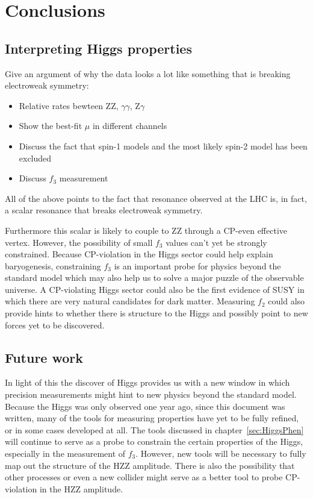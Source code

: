 



\chapter{Conclusions}
\label{sec:Conclusions}

\section{Interpreting Higgs properties}

Give an argument of why the data looks a lot like 
something that is breaking electroweak symmetry:

\begin{itemize}
  \item Relative rates bewteen ZZ, $\gamma\gamma$, Z$\gamma$
  \item Show the best-fit $\mu$ in different channels
  \item Discuss the fact that spin-1 models and the most 
    likely spin-2 model has been excluded
  \item Discuss $f_3$ measurement
\end{itemize}

All of the above points to the fact that resonance observed
at the LHC is, in fact, a scalar resonance that breaks electroweak 
symmetry.  


Furthermore this scalar is likely to couple to 
ZZ through a CP-even effective vertex.  However, the possibility
of small $f_3$ values can't yet be strongly constrained.  Because 
CP-violation in the Higgs sector could help explain 
baryogenesis, constraining $f_3$ is an important probe for physics
beyond the standard model which may also help us to solve a major
puzzle of the observable universe.  
A CP-violating Higgs sector could also be the first evidence of 
SUSY in which there are very natural candidates for dark matter. 
Measuring $f_2$ could also
provide hints to whether there is structure to the Higgs and
possibly point to new forces yet to be discovered.  

\section{Future work}

In light of this the discover of Higgs provides us with a new 
window in which precision measurements might hint to new physics
beyond the standard model.  Because the Higgs was only observed
one year ago, since this document was written, many of the tools
for measuring properties have yet to be fully refined, or in some
cases developed at all.  The tools discussed in 
chapter~\ref{sec:HiggsPhen} will continue to serve as a probe to 
constrain the certain properties of the Higgs, especially in the
measurement of $f_3$.  However, new tools will be necessary to 
fully map out the structure of the HZZ amplitude.  There is 
also the possibility that other processes or even a new collider 
might serve as a better tool to probe CP-violation in the HZZ 
amplitude.  

